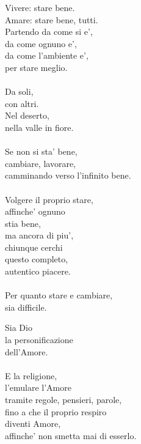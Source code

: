 \begin{haiku}
    Vivere: stare bene.\\
    Amare: stare bene, tutti.\\
    Partendo da come si e',\\
    da come ognuno e',\\
    da come l'ambiente e',\\
    per stare meglio.\\
    \leavevmode\\
    Da soli,\\
    con altri.\\
    Nel deserto,\\
    nella valle in fiore.\\
    \leavevmode\\
    Se non si sta' bene,\\
    cambiare, lavorare,\\
    camminando verso l'infinito bene.\\
    \leavevmode\\
    Volgere il proprio stare,\\
    affinche' ognuno\\
    stia bene,\\
    ma ancora di piu',\\
    chiunque cerchi \\
    questo completo,\\
    autentico piacere.\\
    \leavevmode\\
    Per quanto stare e cambiare,\\
    sia difficile.\\
\end{haiku}

\begin{haiku}
    Sia Dio\\
    la personificazione\\
    dell'Amore.\\
    \leavevmode\\
    E la religione,\\
    l'emulare l'Amore\\
    tramite regole, pensieri, parole,\\
    fino a che il proprio respiro\\
    diventi Amore,\\
    affinche' non smetta mai di esserlo.\\
\end{haiku}

